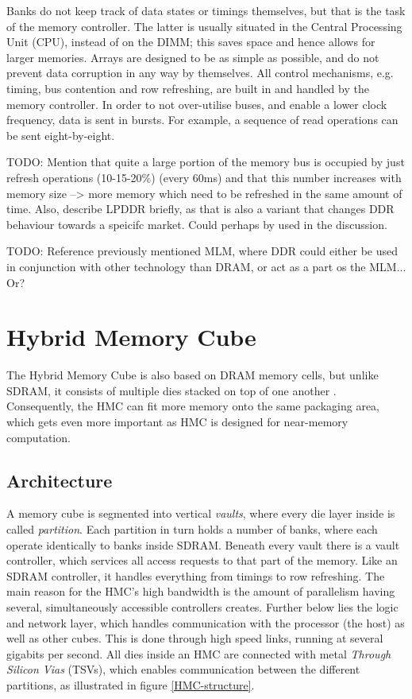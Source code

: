 Banks do not keep track of data states or timings themselves, but that is the task of the memory controller. The latter is usually situated in the Central Processing Unit (CPU), instead of on the DIMM; this saves space and hence allows for larger memories. Arrays are designed to be as simple as possible, and do not prevent data corruption in any way by themselves. All control mechanisms, e.g. timing, bus contention and row refreshing, are built in and handled by the memory controller. In order to not over-utilise buses, and enable a lower clock frequency, data is sent in bursts. For example, a sequence of read operations can be sent eight-by-eight. 

TODO: Mention that quite a large portion of the memory bus is occupied by just refresh operations (10-15-20\%) (every 60ms) and that this number increases with memory size --> more memory which need to be refreshed in the same amount of time. Also, describe LPDDR briefly, as that is also a variant that changes DDR behaviour towards a speicifc market. Could perhaps by used in the discussion. \bigskip

TODO: Reference previously mentioned MLM, where DDR could either be used in conjunction with other technology than DRAM, or act as a part os the MLM... Or?

\section{Hybrid Memory Cube}
The Hybrid Memory Cube is also based on DRAM memory cells, but unlike SDRAM, it consists of multiple dies stacked on top of one another \cite{hybrid2013hybrid}. Consequently, the HMC can fit more memory onto the same packaging area, which gets even more important as HMC is designed for near-memory computation. 

\subsection{Architecture}
A memory cube is segmented into vertical \emph{vaults}, where every die layer inside is called \emph{partition}. Each partition in turn holds a number of banks, where each operate identically to banks inside SDRAM. Beneath every vault there is a vault controller, which services all access requests to that part of the memory. Like an SDRAM controller, it handles everything from timings to row refreshing. The main reason for the HMC's high bandwidth is the amount of parallelism having several, simultaneously accessible controllers creates. Further below lies the logic and network layer, which handles communication with the processor (the host) as well as other cubes. This is done through high speed links, running at several gigabits per second. All dies inside an HMC are connected with metal \emph{Through Silicon Vias} (TSVs), which enables communication between the different partitions, as illustrated in figure \ref{HMC-structure}. 
\bigskip

